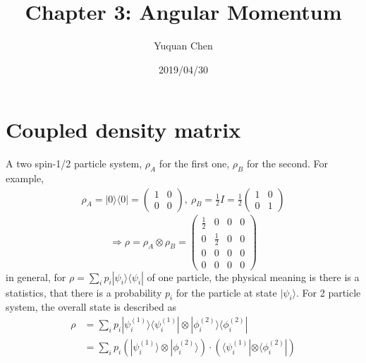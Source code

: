 \documentclass[UTF8,12pt]{article} %
\numberwithin{equation}{section}
\begin{document}
\title{Chapter 3: Angular Momentum}
\author{Yuquan Chen}
\date{2019/04/30} %
\maketitle

\section{Coupled density matrix}

A two spin-1/2 particle system, $\rho_{A}$ for the first one, $\rho_{B}$ for the second. For example, 
\begin{align*}
\rho_{A} = |0\rangle\langle 0| = \begin{pmatrix}1&0\\0&0\end{pmatrix},~ \rho_{B} = \frac{1}{2} I = \frac{1}{2}\begin{pmatrix}1&0\\0&1\end{pmatrix}
\end{align*}
$$\Rightarrow \rho = \rho_{A} \otimes \rho_{B} = \begin{pmatrix}\frac{1}{2}&0&0&0\\0&\frac{1}{2}&0&0\\0&0&0&0\\0&0&0&0\end{pmatrix}$$
in general, for $\rho = \sum_{i}p_{i}|\psi_{i}\rangle\langle \psi_{i}|$ of one particle, the physical meaning is there is a statistics, that there is a probability $p_{i}$ for the particle at state $|\psi_{i}\rangle$. For 2 particle system, the overall state is described as
\begin{align}
\rho &= \sum_{i}p_{i}|\psi_{i}^{(1)}\rangle\langle\psi_{i}^{(1)}| \otimes |\phi_{i}^{(2)}\rangle\langle\phi_{i}^{(2)}| \\
&= \sum_{i} p_{i}\left(|\psi_{i}^{(1)}\rangle \otimes |\phi_{i}^{(2)}\rangle\right) \cdot \left(\langle\psi_{i}^{(1)}|\otimes\langle\phi_{i}^{(2)}|\right)
\end{align}
\end{document}
